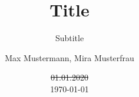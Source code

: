 \author{
	Max Mustermann,
	Mira Musterfrau
}
\titlehead{titlehead}
\subject{Subject}
\title{Title}
\subtitle{Subtitle}
\date{\st{01.01.2020}\\\today}
